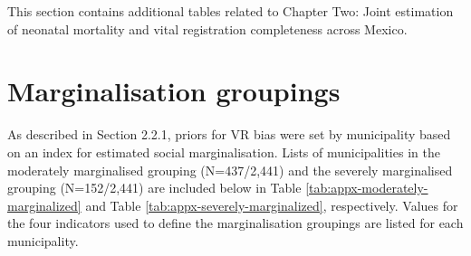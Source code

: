 \documentclass[
]{report}
\begin{document}
This section contains additional tables related to Chapter Two: Joint estimation of neonatal mortality and vital registration completeness across Mexico.

\hypertarget{marginalisation-groupings}{%
\section*{Marginalisation groupings}\label{marginalisation-groupings}}

As described in Section 2.2.1, priors for VR bias were set by municipality based on an index for estimated social marginalisation. Lists of municipalities in the moderately marginalised grouping (N=437/2,441) and the severely marginalised grouping (N=152/2,441) are included below in Table \ref{tab:appx-moderately-marginalized} and Table \ref{tab:appx-severely-marginalized}, respectively. Values for the four indicators used to define the marginalisation groupings are listed for each municipality.

\begingroup\fontsize{8}{10}\selectfont
\end{document}
